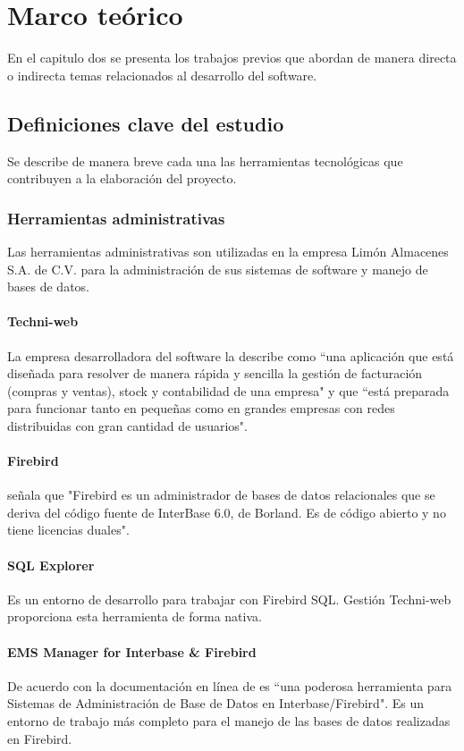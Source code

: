 \chapter{Marco teórico}
	En el capitulo dos se presenta los trabajos previos que abordan de manera directa o indirecta temas relacionados al desarrollo del software.
\section{Definiciones clave del estudio}
	Se describe de manera breve cada una las herramientas tecnológicas que contribuyen a la elaboración del proyecto.
	\subsection{Herramientas administrativas}
	Las herramientas administrativas son utilizadas en la empresa Limón Almacenes S.A. de C.V. para la administración de sus sistemas de software y manejo de bases de datos.
	\subsubsection{Techni-web}
	La empresa desarrolladora del software \textcite{Techniweb} la describe como ``una aplicación que está diseñada para resolver de manera rápida y sencilla la gestión de facturación (compras y ventas), stock y contabilidad de una empresa" y que ``está preparada para funcionar tanto en pequeñas como en grandes empresas con redes distribuidas con gran cantidad de usuarios".
	\subsubsection{Firebird}
	\textcite{Firebird} señala que "Firebird es un administrador de bases de datos relacionales que se deriva del código fuente de InterBase 6.0, de Borland. Es de código abierto y no tiene licencias duales".
	\subsubsection{SQL Explorer}
	Es un entorno de desarrollo para trabajar con Firebird SQL. Gestión Techni-web proporciona esta herramienta de forma nativa.
	\subsubsection{EMS Manager for Interbase \& Firebird}
	De acuerdo con la documentación en línea de \textcite{Solutions2016} es ``una poderosa herramienta para Sistemas de Administración de Base de Datos en Interbase/Firebird". Es un entorno de trabajo más completo para el manejo de las bases de datos realizadas en Firebird.
